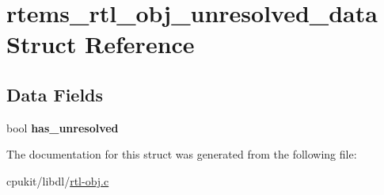 \hypertarget{structrtems__rtl__obj__unresolved__data}{}\section{rtems\+\_\+rtl\+\_\+obj\+\_\+unresolved\+\_\+data Struct Reference}
\label{structrtems__rtl__obj__unresolved__data}
\subsection*{Data Fields}
\begin{DoxyCompactItemize}
\item 
\mbox{\label{structrtems__rtl__obj__unresolved__data_ae63d27f133979238b48c0ec375b8b39c}} 
bool {\bfseries has\+\_\+unresolved}
\end{DoxyCompactItemize}


The documentation for this struct was generated from the following file\+:\begin{DoxyCompactItemize}
\item 
cpukit/libdl/\mbox{\hyperlink{rtl-obj_8c}{rtl-\/obj.\+c}}\end{DoxyCompactItemize}
